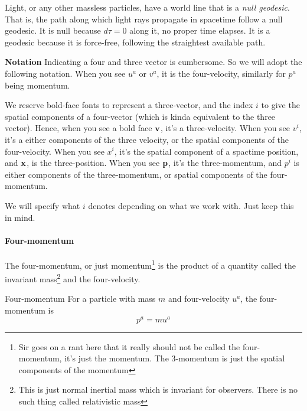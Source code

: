 			Light, or any other massless particles, have a world line that is a \textit{null geodesic}.
			That is, the path along which light rays propagate in 
			spacetime follow a null geodesic. It is null because $d\tau=0$ along it, no proper
			time elapses. It is a geodesic because it is force-free, following the straightest
			available path.
			\begin{remark}
				\textbf{Notation}\hspace{1em}
				Indicating a four and three vector is cumbersome.
				So we will adopt the following notation.
				When you see $u^a$ or $v^a$, it is the four-velocity,
				similarly for $p^a$ being momentum.
				
				\hspace{1em}
				We reserve bold-face fonts to represent a three-vector,
				and the index $i$ to give the spatial components of 
				a four-vector (which is kinda equivalent to the three vector).
				Hence, when you see a bold face $\vb{v}$,
				it's a three-velocity. When you see $v^i$, it's a either components of the three velocity, or the
				spatial components of the four-velocity.
				When you see $x^i$, it's the spatial component of 
				a spactime position, and $\vb{x}$, is the three-position. 
				When you see $\vb{p}$, it's the three-momentum, and $p^i$ is either components 
				of the three-momentum, or spatial components of the four-momentum.

				\hspace{1em}We will specify what $i$ denotes depending on what we work with. Just keep this in mind.
			\end{remark}
		\paragraph{Four-momentum}
			
			The four-momentum, or just momentum\footnote{Sir goes on a rant here that it really should not be called the four-momentum, it's just the momentum. The 3-momentum is just the spatial components of the momentum}
			is the product of a quantity called the 
			invariant mass\footnote{This is just normal inertial mass which
			is invariant for observers. There is no such thing called 
			relativistic mass} and the four-velocity.
			
			\begin{definition}{Four-momentum}
			    For a particle with mass $m$ and four-velocity $u^a$, the 
				four-momentum is
				\[
					p^a = mu^a
				\]
			\end{definition}
			
